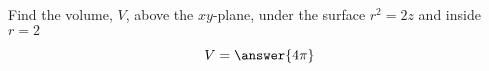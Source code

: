 \documentclass{ximera}
\author{David Guichard \and Neal Koblitz \and H. Jerome Keisler \and Albert Scheller \and Barry Balof \and Mike Wills \and Matthew Carr}
\begin{document}
\begin{exercise}





Find the volume, $V$, above the $xy$-plane, under the surface $r^2=2z$ and inside $r=2$
\begin{prompt}
\[
V=\answer{4\pi}
\]
\end{prompt}



\end{exercise}
\end{document}
